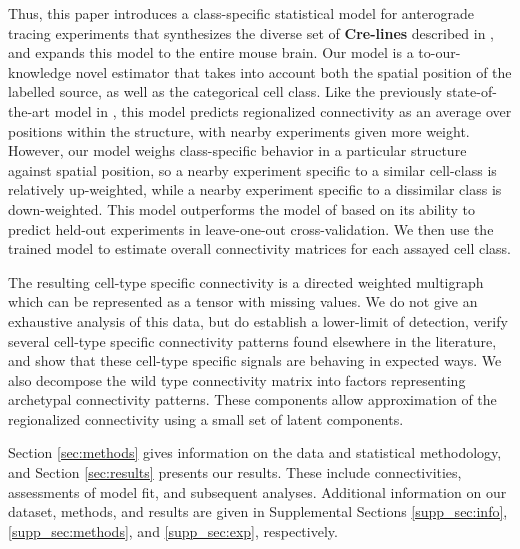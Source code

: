 Thus, this paper introduces a class-specific statistical model for anterograde tracing experiments that synthesizes the diverse set of \textbf{Cre-lines} described in \citet{Harris2019-mr}, and expands this model to the entire mouse brain.
Our model is a to-our-knowledge novel estimator that takes into account both the spatial position of the labelled source, as well as the categorical cell class.
Like the previously state-of-the-art model in \citet{Knox2019-ot}, this model predicts regionalized connectivity as an average over positions within the structure, with nearby experiments given more weight.
However, our model weighs class-specific behavior in a particular structure against spatial position, so a nearby experiment specific to a similar cell-class is relatively up-weighted, while a nearby experiment specific to a dissimilar class is down-weighted.
This model outperforms the model of  \citet{Knox2019-ot} based on its ability to predict held-out experiments in leave-one-out cross-validation.
We then use the trained model to estimate overall connectivity matrices for each assayed cell class.

The resulting cell-type specific connectivity is a directed weighted multigraph which can be represented as a tensor with missing values.
We do not give an exhaustive analysis of this data, but do establish a lower-limit of detection, verify several cell-type specific connectivity patterns found elsewhere in the literature, and show that these cell-type specific signals are behaving in expected ways.
We also decompose the wild type connectivity matrix into factors representing archetypal connectivity patterns.
These components allow approximation of the regionalized connectivity using a small set of latent components.

Section \ref{sec:methods} gives information on the data and statistical methodology, and Section \ref{sec:results} presents our results.
These include connectivities, assessments of model fit, and subsequent analyses.
Additional information on our dataset, methods, and results are given in Supplemental Sections \ref{supp_sec:info}, \ref{supp_sec:methods}, and \ref{supp_sec:exp}, respectively.